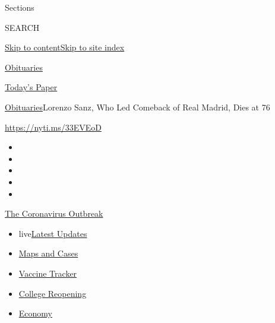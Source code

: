 Sections

SEARCH

\protect\hyperlink{site-content}{Skip to
content}\protect\hyperlink{site-index}{Skip to site index}

\href{https://www.nytimes.com/section/obituaries}{Obituaries}

\href{https://myaccount.nytimes.com/auth/login?response_type=cookie\&client_id=vi}{}

\href{https://www.nytimes.com/section/todayspaper}{Today's Paper}

\href{/section/obituaries}{Obituaries}\textbar{}Lorenzo Sanz, Who Led
Comeback of Real Madrid, Dies at 76

\url{https://nyti.ms/33EVEoD}

\begin{itemize}
\item
\item
\item
\item
\item
\end{itemize}

\href{https://www.nytimes.com/news-event/coronavirus?action=click\&pgtype=Article\&state=default\&region=TOP_BANNER\&context=storylines_menu}{The
Coronavirus Outbreak}

\begin{itemize}
\tightlist
\item
  live\href{https://www.nytimes.com/2020/08/03/world/coronavirus-covid-19.html?action=click\&pgtype=Article\&state=default\&region=TOP_BANNER\&context=storylines_menu}{Latest
  Updates}
\item
  \href{https://www.nytimes.com/interactive/2020/us/coronavirus-us-cases.html?action=click\&pgtype=Article\&state=default\&region=TOP_BANNER\&context=storylines_menu}{Maps
  and Cases}
\item
  \href{https://www.nytimes.com/interactive/2020/science/coronavirus-vaccine-tracker.html?action=click\&pgtype=Article\&state=default\&region=TOP_BANNER\&context=storylines_menu}{Vaccine
  Tracker}
\item
  \href{https://www.nytimes.com/2020/08/02/us/covid-college-reopening.html?action=click\&pgtype=Article\&state=default\&region=TOP_BANNER\&context=storylines_menu}{College
  Reopening}
\item
  \href{https://www.nytimes.com/live/2020/08/03/business/stock-market-today-coronavirus?action=click\&pgtype=Article\&state=default\&region=TOP_BANNER\&context=storylines_menu}{Economy}
\end{itemize}


